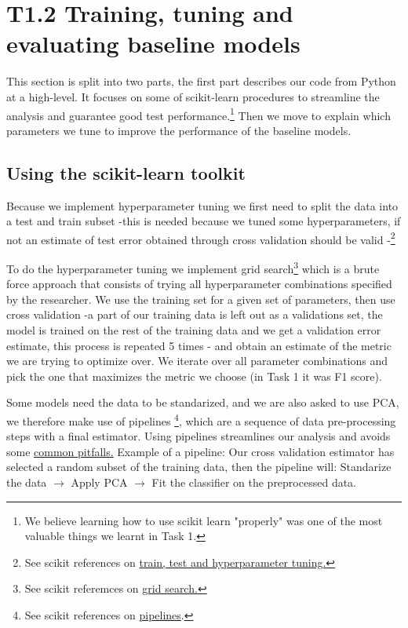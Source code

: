 \documentclass{article}
\begin{document}
\section*{T1.2 Training, tuning and evaluating baseline models}
This section is split into two parts, the first part describes our code from Python at a high-level. It focuses on some of scikit-learn procedures to streamline the analysis 
and guarantee good test performance.\footnote{We believe learning how to use scikit learn "properly" was one of the most valuable things we learnt in Task 1.} Then we move to explain which parameters we tune to improve the performance of the baseline models.

\subsection*{Using the scikit-learn toolkit}
Because we implement hyperparameter tuning we first need to split the data into a test and train subset -this is needed because we tuned some hyperparameters, if not an estimate of test error obtained through cross validation should be valid -\footnote{See scikit references on \href{https://scikit-learn.org/1.5/modules/cross_validation.html}{train, test and hyperparameter tuning.}}

To do the hyperparameter tuning we implement grid search\footnote{See scikit referemces on \href{https://scikit-learn.org/1.5/modules/grid_search.html}{grid search.}
} which is a brute force approach that consists of trying all hyperparameter combinations specified by the researcher. 
We use the training set for a given set of parameters, then use cross validation -a part of our training data is left out as a validations set, the model is trained on the rest of the training data and we get a validation error estimate, this process is repeated 5 times - and obtain an estimate of the metric we are trying to optimize over.
We iterate over all parameter combinations and pick the one that maximizes the metric we choose (in Task 1 it was F1 score).

Some models need the data to be standarized, and we are also asked to use PCA, we therefore make use of pipelines \footnote{See scikit references on
\href{https://scikit-learn.org/stable/modules/generated/sklearn.pipeline.Pipeline.html}{pipelines}.}, which are a sequence of data pre-processing steps with a final estimator. Using pipelines 
streamlines our analysis and avoids some \href{https://scikit-learn.org/stable/common_pitfalls.html}{common pitfalls.}
Example of a pipeline: Our cross validation estimator has selected a random subset of the training data, then the pipeline will: Standarize the data $\rightarrow$ Apply PCA $\rightarrow$ Fit the classifier on the preprocessed data.
\end{document}
